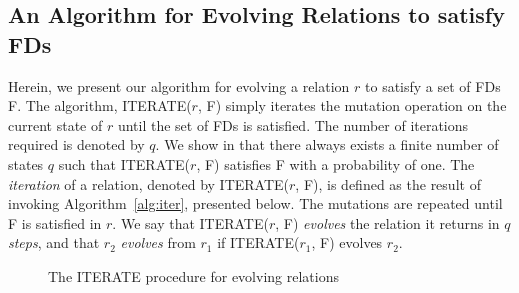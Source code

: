 \subsection{An Algorithm for Evolving Relations to satisfy FDs}
\label{sec:evolve}


Herein, we present our algorithm for evolving a relation $r$ to satisfy a set
of FDs F. The algorithm, ITERATE($r$, F) simply iterates 
the mutation operation on the current state of $r$ until the set of
FDs is satisfied. The number of iterations required is denoted by $q$.
We show in \cite{cl96} that there always exists a finite number of states $q$
such that ITERATE($r$, F) satisfies F with a probability of one.
The {\em iteration} of a relation, denoted by ITERATE($r$, F),
is defined as the result of invoking Algorithm~\ref{alg:iter},
presented below. The mutations are repeated until F is satisfied in $r$.
We say that ITERATE($r$, F) {\em evolves} the relation it returns
in $q$ {\em steps}, and that $r_2$ {\em evolves} from $r_1$
if ITERATE($r_1$, F) evolves $r_2$.

{\line
\begin{figure}[ht]
\begin{center}
\end{center}
\caption{\label{numdep:fig:iterate} The ITERATE procedure for
evolving relations}
\end{figure}
}

